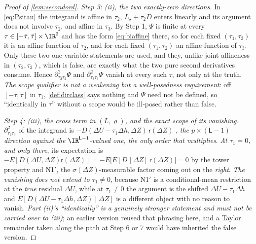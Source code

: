 \begin{proof}[Proof of \cref{lem:secondord}]
\emph{Step 3: (ii), the two exactly-zero directions.}
In \eqref{eq:Psitau} the integrand is affine in $\tau_2$, $L_\star+\tau_2D$ enters linearly and its
argument does not involve $\tau_2$, and affine in $\tau_3$. By Step 1, $\Psi$ is finite at every
$\tau\in[-\bar\tau,\bar\tau]\times\IR^{2}$ and has the form \eqref{eq:biaffine} there, so for each fixed
$(\tau_1,\tau_3)$ it is an affine function of $\tau_2$, and for each fixed $(\tau_1,\tau_2)$ an affine
function of $\tau_3$. Only these two one-variable statements are used, and they, unlike joint
affineness in $(\tau_2,\tau_3)$, which is false, are exactly what the two pure second derivatives
consume. Hence $\partial^{2}_{\tau_2\tau_2}\Psi$ and
$\partial^{2}_{\tau_3\tau_3}\Psi$ vanish at every such $\tau$, not only at the truth. \emph{The scope
qualifier is not a weakening but a well-posedness requirement}: off $[-\bar\tau,\bar\tau]$ in $\tau_1$,
\cref{def:dirclass} says nothing and $\Psi$ need not be defined, so ``identically in $\tau$'' without a
scope would be ill-posed rather than false.

\emph{Step 4: (iii), the cross term in $(L,\varrho)$, and the exact scope of its vanishing.}
$\partial^{2}_{\tau_2\tau_3}$ of the integrand is $-D(\Delta U-\tau_1\Delta h,\Delta Z)\,\mathsf r(\Delta Z)$
, \emph{the $p\times(\mathsf L-1)$ direction against the $\IR^{\mathsf L-1}$-valued one, the only order
that multiplies}. \emph{At $\tau_1=0$, and only there}, its expectation is
$-E[D(\Delta U,\Delta Z)\mathsf r(\Delta Z)]=-E\big[E[D\mid\Delta Z]\,\mathsf r(\Delta Z)\big]=0$ by the
tower
property and N1$'$, the $\sigma(\Delta Z)$-measurable factor coming out on the \emph{right}.
\emph{The vanishing does not extend to $\tau_1\ne0$}, because N1$'$ is a
conditional-mean restriction at the \emph{true} residual $\Delta U$, while at
$\tau_1\ne0$ the argument is the shifted $\Delta U-\tau_1\Delta h$ and $E[D(\Delta U-\tau_1\Delta h,\Delta Z)\mid\Delta Z]$
is a different object with no reason to vanish. \emph{Part (ii)'s ``identically'' is a genuinely
stronger statement and must not be carried over to (iii)}; an earlier version
reused that phrasing here, and a Taylor remainder taken along the path at Step 6 or 7 would have
inherited the false version.


\end{proof}
